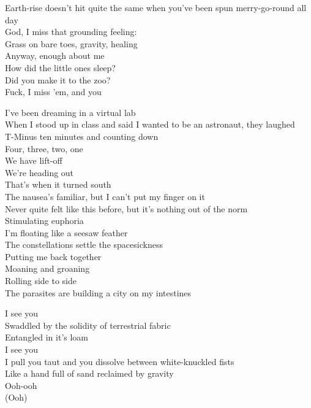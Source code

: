 Earth-rise doesn't hit quite the same when you've been spun merry-go-round all day\\
God, I miss that grounding feeling:\\
Grass on bare toes, gravity, healing\\
Anyway, enough about me\\
How did the little ones sleep?\\
Did you make it to the zoo?\\
Fuck, I miss 'em, and you\\


I've been dreaming in a virtual lab\\
When I stood up in class and said I wanted to be an astronaut, they laughed\\
T-Minus ten minutes and counting down\\
Four, three, two, one\\
We have lift-off\\
We're heading out\\
That's when it turned south\\

The nausea's familiar, but I can't put my finger on it\\
Never quite felt like this before, but it's nothing out of the norm\\
Stimulating euphoria\\
I'm floating like a seesaw feather\\
The constellations settle the spacesickness\\
Putting me back together\\

Moaning and groaning\\
Rolling side to side\\
The parasites are building a city on my intestines\\


I see you\\
Swaddled by the solidity of terrestrial fabric\\
Entangled in it's loam\\
I see you\\
I pull you taut and you dissolve between white-knuckled fists\\
Like a hand full of sand reclaimed by gravity\\
Ooh-ooh\\
(Ooh)\\

